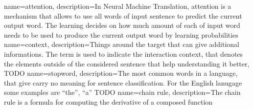 

{
  name={attention},
  description={In Neural Machine Translation, attention is a mechanism that allows to use all words of input sentence to predict the current output word. The learning decides on how much amount of each of input word needs to be used to produce the current output word by learning probabilities}
}
{
  name={context},
  description={Things around the target that can give additional informations. The term is used to indicate the interaction context, that denotes the elements outside of the considered sentence that help understanding it better, TODO}
}
{
  name={stopword},
  description={The most common words in a language, that give carry no meaning for sentence classification. For the English lanugage some examples are ``the'', ``a'' TODO}
}
{
  name={chain rule},
  description={The chain rule is a formula for computing the derivative of a composed function}
}

\glsaddall

